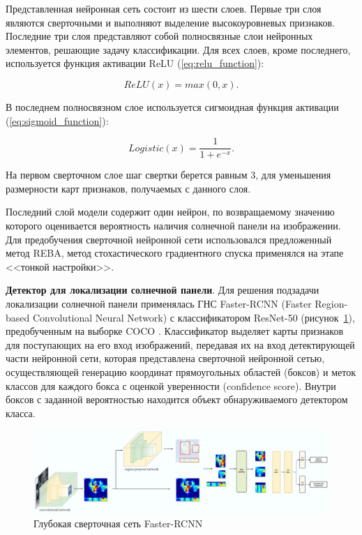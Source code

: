 Представленная нейронная сеть состоит из шести слоев. Первые три слоя являются сверточными и выполняют выделение высокоуровневых признаков. Последние три слоя представляют собой полносвязные слои нейронных элементов, решающие задачу классификации. Для всех слоев, кроме последнего, используется функция активации ReLU (\ref{eq:relu_function}):

\begin{equation}
    \label{eq:relu_function}
    ReLU(x) = max(0, x).
\end{equation}

В последнем полносвязном слое используется сигмоидная функция активации (\ref{eq:sigmoid_function}):

\begin{equation}
    \label{eq:sigmoid_function}
    Logistic(x) = \frac{1}{1+e^{-x}}.
\end{equation}

На первом сверточном слое шаг свертки берется равным 3, для уменьшения размерности карт признаков, получаемых с данного слоя.

Последний слой модели содержит один нейрон, по возвращаемому значению которого оценивается вероятность наличия солнечной панели на изображении. Для предобучения сверточной нейронной сети использовался предложенный метод REBA, метод стохастического градиентного спуска применялся на этапе <<тонкой настройки>>. 

\textbf{Детектор для локализации солнечной панели}. Для решения подзадачи локализации солнечной панели применялась ГНС Faster-RCNN (Faster Region-based Convolutional Neural Network) с классификатором ResNet-50 (рисунок~\ref{fig:faster_rcnn}), предобученным на выборке COCO \cite[c.~2]{lin2015}. Классификатор выделяет карты признаков для поступающих на его вход изображений, передавая их на вход детектирующей части нейронной сети, которая представлена сверточной нейронной сетью, осуществляющей генерацию координат прямоугольных областей (боксов) и меток классов для каждого бокса с оценкой уверенности (confidence score). Внутри боксов с заданной вероятностью находится объект обнаруживаемого детектором класса.

\begin{figure}[ht]
	\centering
	\includegraphics[width=17cm]{man-source/images/ch4/pic4-21.jpg}
	\caption{Глубокая сверточная сеть Faster-RCNN \cite{ren}}
	\label{fig:faster_rcnn}
\end{figure}

